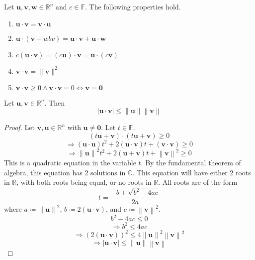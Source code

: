 \begin{theorem}
    Let \(\mathbf{u} ,\mathbf{v} ,\mathbf{w} \in\mathbb{R} ^n\) and \(c\in\mathbb{F} \). The following properties hold.
    \begin{enumerate}
        \item \(\mathbf{u} \cdot \mathbf{v} =\mathbf{v} \cdot \mathbf{u} \) 
        \item \(\mathbf{u} \cdot (\mathbf{v} +wbv) = \mathbf{u} \cdot \mathbf{v}  + \mathbf{u} \cdot \mathbf{w} \) 
        \item \(c(\mathbf{u} \cdot \mathbf{v} )=(c \mathbf{u} )\cdot \mathbf{v} = \mathbf{u} \cdot (c \mathbf{v} )\) 
        \item \(\mathbf{v} \cdot \mathbf{v} = \lVert \mathbf{v}  \rVert^2 \) 
        \item \(\mathbf{v} \cdot \mathbf{v} \geq 0 \land \mathbf{v} \cdot \mathbf{v} =0 \iff \mathbf{v} =\mathbf{0} \) 
    \end{enumerate}
\end{theorem}
\begin{theorem}
    Let \(\mathbf{u} ,\mathbf{v} \in\mathbb{R} ^n\). Then
    \[
        \left\vert \mathbf{u} \cdot \mathbf{v}  \right\vert \leq \left\lVert \mathbf{u}  \right\rVert \left\lVert \mathbf{v}  \right\rVert 
    \]
\end{theorem}
\begin{proof}
    Let \(\mathbf{v} ,\mathbf{u} \in\mathbb{R} ^n\) with \(\mathbf{u} \neq \mathbf{0} \). Let \(t\in\mathbb{F} \).
    \[
        (t \mathbf{u} +\mathbf{v} )\cdot (t \mathbf{u} +\mathbf{v} )\geq 0
    \]
    \[
        \Longrightarrow (\mathbf{u} \cdot \mathbf{u} )t^2 + 2(\mathbf{u} \cdot \mathbf{v} )t+(\mathbf{v} \cdot \mathbf{v} )\geq 0
    \]
    \[
        \Longrightarrow \left\lVert \mathbf{u}  \right\rVert^2 t^2 + 2(\mathbf{u} +\mathbf{v} )t +\left\lVert \mathbf{v}  \right\rVert^2 \geq 0 
    \]
    This is a quadratic equation in the variable \(t\). By the fundamental theorem of algebra, this equation has \(2\) solutions in \(\mathbb{C} \). This equation will have either 2 roots in \(\mathbb{R} \), with both roots being equal, or no roots in \(\mathbb{R} \). All roots are of the form
    \[
        t = \frac{-b \pm \sqrt{b^2 - 4ac} }{2a}
    \]
    where \(a\coloneqq \left\lVert  \mathbf{u}  \right\rVert^2 \), \(b\coloneqq 2(\mathbf{u} \cdot \mathbf{v} )\), and \(c\coloneqq \left\lVert \mathbf{v}  \right\rVert^2 \).
    \[
        b^2 - 4ac \leq 0
    \]
    \[
        \Longrightarrow b^2 \leq 4ac
    \]
    \[
        \Longrightarrow (2(\mathbf{u} \cdot \mathbf{v} ))^2 \leq 4 \left\lVert \mathbf{u}  \right\rVert^2 \left\lVert \mathbf{v}  \right\rVert^2  
    \]
    \[
        \Longrightarrow\left|\mathbf{u} \cdot \mathbf{v}\right| \leq \left\lVert \mathbf{u}  \right\rVert \left\lVert \mathbf{v}  \right\rVert 
    \]
\end{proof}